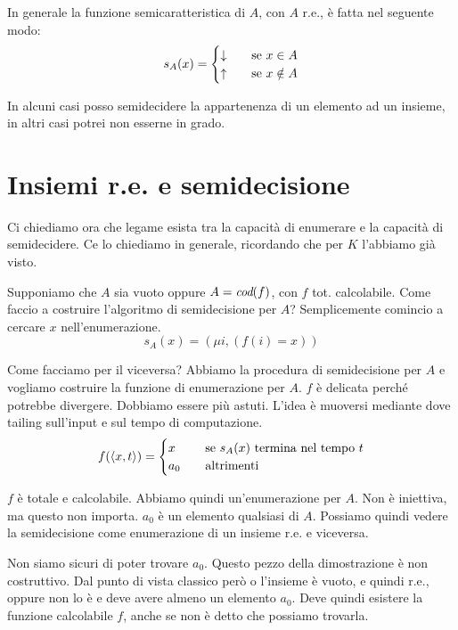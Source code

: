 In generale la funzione semicaratteristica di $A$, con $A$ r.e., è fatta nel seguente modo:
\begin{equation*}
    s_{A}(x) = 
    \begin{cases}
        \downarrow \quad &\text{se $x \in A$} \\
        \uparrow \quad &\text{se $x \notin A$}
    \end{cases}
\end{equation*}

In alcuni casi posso semidecidere la appartenenza di un elemento ad un insieme, in altri casi potrei
non esserne in grado.

\section{Insiemi r.e. e semidecisione}

Ci chiediamo ora che legame esista tra la capacità di enumerare e la capacità di semidecidere. Ce
lo chiediamo in generale, ricordando che per $K$ l'abbiamo già visto.

Supponiamo che $A$ sia vuoto oppure $A = \textit{cod}(f)$, con $f$ tot. calcolabile. Come faccio a costruire
l'algoritmo di semidecisione per $A$? Semplicemente comincio a cercare $x$ nell'enumerazione.
\begin{equation*}
    s_{A}(x) = (\mu i, (f(i) = x))
\end{equation*}

Come facciamo per il viceversa? Abbiamo la procedura di semidecisione per $A$ e vogliamo costruire la
funzione di enumerazione per $A$. $f$ è delicata perché potrebbe divergere. Dobbiamo essere più
astuti. L'idea è muoversi mediante dove tailing sull'input e sul tempo di computazione.
\begin{equation*}
    f(\langle x, t \rangle) =
    \begin{cases}
        x \quad &\text{se $s_{A}(x)$ termina nel tempo $t$} \\
        a_{0} \quad &\text{altrimenti}
    \end{cases}
\end{equation*}

$f$ è totale e calcolabile. Abbiamo quindi un'enumerazione per $A$. Non è iniettiva, ma questo non
importa. $a_{0}$ è un elemento qualsiasi di $A$. Possiamo quindi vedere la semidecisione come
enumerazione di un insieme r.e. e viceversa.

Non siamo sicuri di poter trovare $a_{0}$. Questo pezzo della dimostrazione è non costruttivo. Dal
punto di vista classico però o l'insieme è vuoto, e quindi r.e., oppure non lo è e deve avere almeno
un elemento $a_{0}$. Deve quindi esistere la funzione calcolabile $f$, anche se non è detto che
possiamo trovarla.

